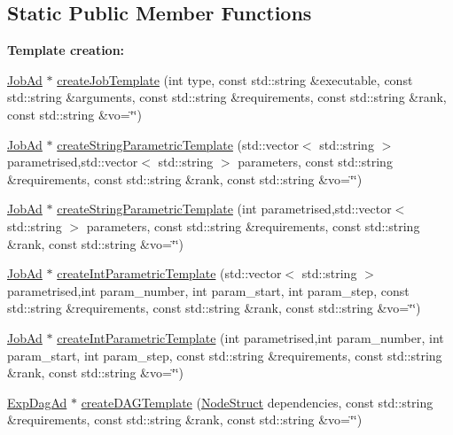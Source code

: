 \subsection*{Static Public Member Functions}
\begin{Indent}{\bf Template creation:}\par
\begin{CompactItemize}
\item 
\hyperlink{classglite_1_1wms_1_1jdl_1_1JobAd}{Job\-Ad} $\ast$ \hyperlink{classglite_1_1wms_1_1jdl_1_1AdConverter_z21_0}{create\-Job\-Template} (int type, const std::string \&executable, const std::string \&arguments, const std::string \&requirements, const std::string \&rank, const std::string \&vo=\char`\"{}\char`\"{})
\item 
\hyperlink{classglite_1_1wms_1_1jdl_1_1JobAd}{Job\-Ad} $\ast$ \hyperlink{classglite_1_1wms_1_1jdl_1_1AdConverter_z21_1}{create\-String\-Parametric\-Template} (std::vector$<$ std::string $>$ parametrised,std::vector$<$ std::string $>$ parameters, const std::string \&requirements, const std::string \&rank, const std::string \&vo=\char`\"{}\char`\"{})
\item 
\hyperlink{classglite_1_1wms_1_1jdl_1_1JobAd}{Job\-Ad} $\ast$ \hyperlink{classglite_1_1wms_1_1jdl_1_1AdConverter_z21_2}{create\-String\-Parametric\-Template} (int parametrised,std::vector$<$ std::string $>$ parameters, const std::string \&requirements, const std::string \&rank, const std::string \&vo=\char`\"{}\char`\"{})
\item 
\hyperlink{classglite_1_1wms_1_1jdl_1_1JobAd}{Job\-Ad} $\ast$ \hyperlink{classglite_1_1wms_1_1jdl_1_1AdConverter_z21_3}{create\-Int\-Parametric\-Template} (std::vector$<$ std::string $>$ parametrised,int param\_\-number, int param\_\-start, int param\_\-step, const std::string \&requirements, const std::string \&rank, const std::string \&vo=\char`\"{}\char`\"{})
\item 
\hyperlink{classglite_1_1wms_1_1jdl_1_1JobAd}{Job\-Ad} $\ast$ \hyperlink{classglite_1_1wms_1_1jdl_1_1AdConverter_z21_4}{create\-Int\-Parametric\-Template} (int parametrised,int param\_\-number, int param\_\-start, int param\_\-step, const std::string \&requirements, const std::string \&rank, const std::string \&vo=\char`\"{}\char`\"{})
\item 
\hyperlink{classglite_1_1wms_1_1jdl_1_1ExpDagAd}{Exp\-Dag\-Ad} $\ast$ \hyperlink{classglite_1_1wms_1_1jdl_1_1AdConverter_z21_5}{create\-DAGTemplate} (\hyperlink{structglite_1_1wms_1_1jdl_1_1NodeStruct}{Node\-Struct} dependencies, const std::string \&requirements, const std::string \&rank, const std::string \&vo=\char`\"{}\char`\"{})

\end{CompactItemize}
\end{Indent}
